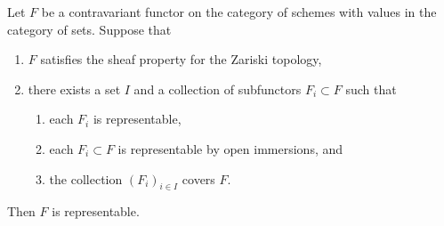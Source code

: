 \begin{lemma}
\label{lemma-glue-functors}
Let $F$ be a contravariant functor on the category of schemes
with values in the category of sets. Suppose that
\begin{enumerate}
\item $F$ satisfies the sheaf property for the Zariski topology,
\item there exists a set $I$ and a collection of subfunctors
$F_i \subset F$ such that
\begin{enumerate}
\item each $F_i$ is representable,
\item each $F_i \subset F$ is representable by open immersions, and
\item the collection $(F_i)_{i \in I}$ covers $F$.
\end{enumerate}
\end{enumerate}
Then $F$ is representable.
\end{lemma}

